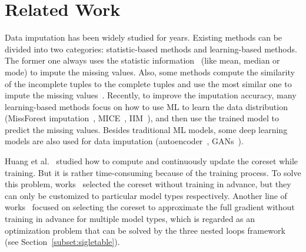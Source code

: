 \section{Related Work}\label{sec:related}

Data imputation has been widely studied for  years. Existing  methods can be divided into two categories: statistic-based methods and learning-based methods. The former one always uses the statistic information~\cite{DBLP:journals/tsmc/FarhangfarKP07, DBLP:conf/sigmod/MayfieldNP10} (like mean, median or mode) to impute the missing values. Also, some methods compute the similarity of the incomplete tuples to the complete tuples and use the most similar one to impute the missing values~\cite{altman1992introduction, DBLP:journals/artmed/JerezMGARMF10, DBLP:conf/isese/TwalaCS05}. Recently, to improve the imputation accuracy,   many learning-based methods focus on how to use ML to learn the data distribution (\eg MissForest imputation~\cite{DBLP:journals/bioinformatics/StekhovenB12}, MICE~\cite{royston2011multiple},  IIM~\cite{DBLP:conf/icde/ZhangSSW19}), and then  use the trained model to predict the missing values. Besides traditional ML models, some deep learning models are also used for data imputation (\eg  autoencoder~\cite{DBLP:journals/corr/GondaraW17, mccoy2018variational, DBLP:journals/pr/NazabalOGV20}, GANs~\cite{DBLP:journals/nn/SpinelliSU20, DBLP:conf/icml/YoonJS18}).
 
Huang et al.~\cite{DBLP:conf/icml/HuangHLFD21} studied how to compute and continuously update the coreset while training. %
But it is rather time-consuming because of the training process. 
 To solve this problem, works~\cite{DBLP:conf/icml/CampbellB18, DBLP:journals/corr/BravermanFL16}   selected the coreset without training in advance, but they can only be customized to particular model types respectively. %
 Another line of works~\cite{DBLP:conf/icml/MirzasoleimanBL20, DBLP:conf/nips/MirzasoleimanCL20, DBLP:conf/emnlp/KirchhoffB14} focused on selecting the coreset to approximate the full gradient without training in advance for multiple model types, which is regarded as an optimization problem that can be solved  by the three nested loops framework (see Section~\ref{subset:sigletable}).


